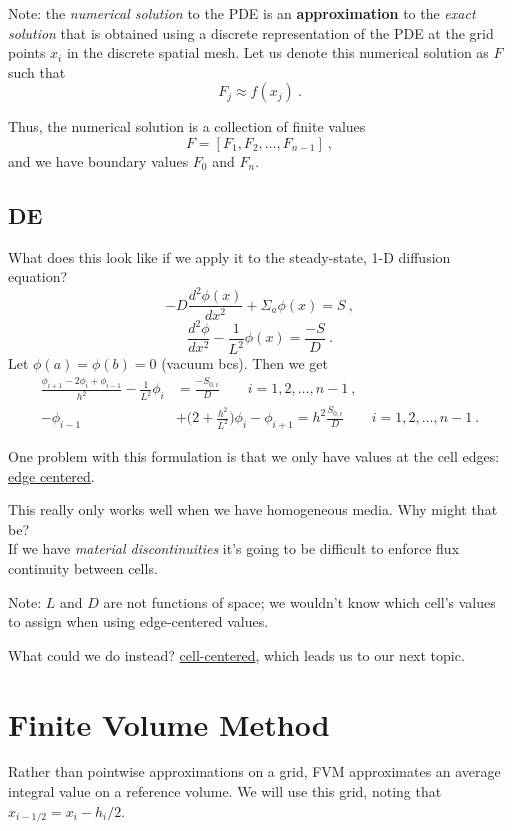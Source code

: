 \documentclass[12pt]{article}
\begin{document}
Note: the \textit{numerical solution} to the PDE is an \textbf{approximation} to the \textit{exact solution} that is obtained using a discrete representation of the PDE at the grid points $x_i$ in the discrete spatial mesh. Let us denote this numerical solution as $F$ such that 
$$F_j \approx f(x_j)\:.$$ 

Thus, the numerical solution is a collection of finite values
$$F = [F_1, F_2, \dots, F_{n-1}]\:,$$
and we have boundary values $F_0$ and $F_n$.


\subsection*{DE}
What does this look like if we apply it to the steady-state, 1-D diffusion equation?
\[-D\frac{d^2 \phi(x)}{dx^2} + \Sigma_a \phi(x) = S\:,\]
\[\frac{d^2 \phi}{dx^2} - \frac{1}{L^2}\phi(x) = \frac{-S}{D}\:.\]
%
Let $\phi(a) = \phi(b) = 0$ (vacuum bcs). Then we get
%
\begin{align}
\frac{\phi_{i+1} - 2\phi_i + \phi_{i-1}}{h^2} - \frac{1}{L^2}\phi_i &= \frac{-S_{0,i}}{D} \qquad i = 1, 2, \dots, n-1 \:,\nonumber \\
%
-\phi_{i-1} &+ \bigl(2 + \frac{h^2}{L^2}\bigr)\phi_i - \phi_{i+1} = h^2 \frac{S_{0,i}}{D} \qquad i = 1, 2, \dots, n-1\:. \nonumber
\end{align}

One problem with this formulation is that we only have values at the cell edges: \underline{edge centered}. 

This really only works well when we have homogeneous media. Why might that be? \\
If we have \textit{material discontinuities} it's going to be difficult to enforce flux continuity between cells. 

Note: $L$ and $D$ are not functions of space; we wouldn't know which cell's values to assign when using edge-centered values. 

What could we do instead? \underline{cell-centered}, which leads us to our next topic.


\section*{Finite Volume Method}
Rather than pointwise approximations on a grid, FVM approximates an average integral value on a reference volume. We will use this grid, noting that $x_{i-1/2} = x_i - h_i/2$.
\end{document}
